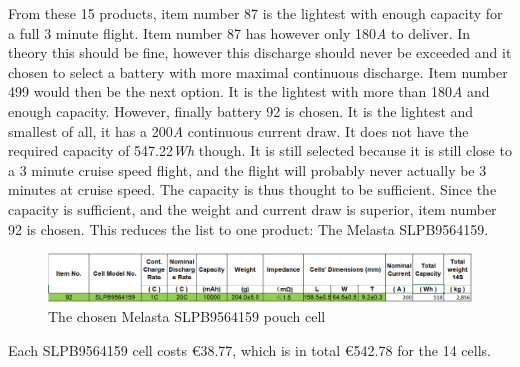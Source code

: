 From these 15 products, item number 87 is the lightest with enough capacity for a full 3 minute flight. Item number 87 has however only 180\textit{A} to deliver. In theory this should be fine, however this discharge should never be exceeded and it chosen to select a battery with more maximal continuous discharge. Item number 499 would then be the next option. It is the lightest with more than 180\textit{A} and enough capacity. However, finally battery 92 is chosen. It is the lightest and smallest of all, it has a 200\textit{A} continuous current draw. It does not have the required capacity of 547.22\textit{Wh} though. It is still selected because it is still close to a 3 minute cruise speed flight, and the flight will probably never actually be 3 minutes at cruise speed. The capacity is thus thought to be sufficient. Since the capacity is sufficient, and the weight and current draw is superior, item number 92 is chosen. This reduces the list to one product: The Melasta SLPB9564159. 

\begin{figure} [H]
	\centering
	\includegraphics[width=1\linewidth]{Figures/melasta_datasheet3.PNG}
	\caption{The chosen Melasta SLPB9564159 pouch cell}
   \label{Fig:melasta_SLPB9564159}
\end{figure}

Each SLPB9564159 cell costs \euro38.77, which is in total \euro542.78 for the 14 cells.
\newpage